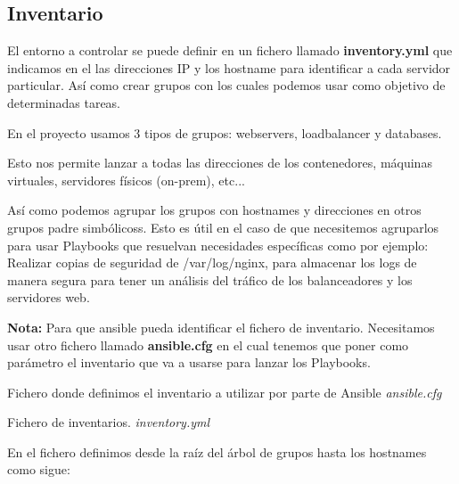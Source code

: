 \newpage
\subsection{Inventario}

El entorno a controlar se puede definir en un fichero llamado \textbf{inventory.yml} que indicamos en el las direcciones IP y los hostname para identificar a cada servidor particular. Así como crear grupos con los cuales podemos usar como objetivo de determinadas tareas.

En el proyecto usamos 3 tipos de grupos:
webservers, loadbalancer y databases.

Esto nos permite lanzar a todas las direcciones de los contenedores, máquinas virtuales, servidores físicos (on-prem), etc...

Así como podemos agrupar los grupos con hostnames y direcciones en otros grupos padre simbólicoss. Esto es útil en el caso de que necesitemos agruparlos para usar Playbooks que resuelvan necesidades específicas como por ejemplo: Realizar copias de seguridad de /var/log/nginx, para almacenar los logs de manera segura para tener un análisis del tráfico de los balanceadores y los servidores web.

\textbf{Nota:} Para que ansible pueda identificar el fichero de inventario. Necesitamos usar otro fichero llamado \textbf{ansible.cfg} en el cual tenemos que poner como parámetro el inventario que va a usarse para lanzar los Playbooks.

Fichero donde definimos el inventario a utilizar por parte de Ansible \emph{ansible.cfg}



Fichero de inventarios. \emph{inventory.yml}



En el fichero definimos desde la raíz del árbol de grupos hasta los hostnames como sigue:

